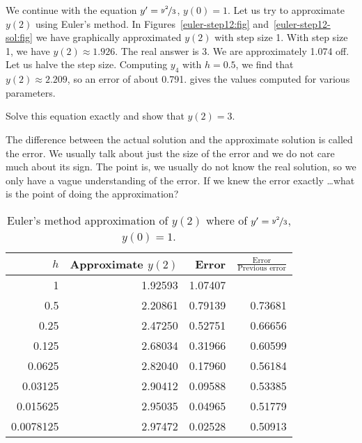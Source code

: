 We continue with the equation $y' = \nicefrac{y^2}{3}$, $y(0)=1$.
Let us try
to approximate $y(2)$ using Euler's method.  In
Figures~\ref{euler-step12:fig}
and~\ref{euler-step12-sol:fig} we have 
graphically approximated $y(2)$ with step size 1.  With step
size 1, we have $y(2) \approx 1.926$.  The real
answer is 3.  We are approximately 1.074
off.  Let us halve the step size.
Computing $y_4$ with $h=0.5$,
we find that $y(2) \approx 2.209$, so an error of about 0.791.
 gives the values computed
for various parameters.

\begin{exercise}
Solve this equation exactly and show that $y(2) = 3$.
\end{exercise}

The difference between the actual solution and the approximate solution is
called the error.  We usually talk about just the size of the error
and we do not care much about its sign.  The point is, we usually
do not know the real solution, so we only have a vague understanding of the
error.  If we knew the error exactly \ldots what is the point of doing the
approximation?

\begin{table}[h!t]
\mybeginframe
\capstart
\begin{center}
\begin{tabular}{@{}rrrr@{}}
\toprule
$h$ & Approximate $y(2)$ & Error & $\frac{\text{Error}}{\text{Previous error}}$ \\
\midrule
1        & 1.92593 & 1.07407 & \\
0.5      & 2.20861 & 0.79139 & 0.73681 \\
0.25     & 2.47250 & 0.52751 & 0.66656 \\
0.125    & 2.68034 & 0.31966 & 0.60599 \\
0.0625   & 2.82040 & 0.17960 & 0.56184 \\
0.03125  & 2.90412 & 0.09588 & 0.53385 \\
0.015625 & 2.95035 & 0.04965 & 0.51779 \\
0.0078125& 2.97472 & 0.02528 & 0.50913 \\
\bottomrule
\end{tabular}
\end{center}
\caption{Euler's method approximation of $y(2)$ where
of $y'=\nicefrac{y^2}{3}$, $y(0)=1$.\label{euler-table:table}}
\myendframe
\end{table}

